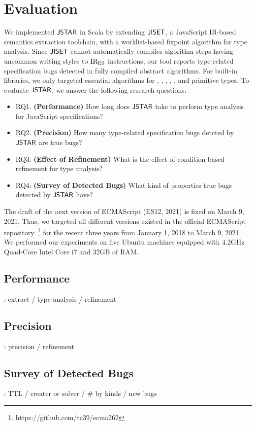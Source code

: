 \section{Evaluation}\label{sec:eval}

We implemented $\textsf{JSTAR}$ in Scala by extending $\textsf{JISET}$, a JavaScript IR-based
semantics extraction toolchain, with a worklist-based fixpoint algorithm for
type analysis.  Since $\textsf{JISET}$ cannot automatically compiles algorithm steps
having uncommon writing styles to ${\text{IR}_\text{ES}}$ instructions, our tool reports
type-related specification bugs detected in fully compiled abstract algorithms.
For built-in libraries, we only targeted essential algorithms for
, , , ,
, and primitive types.  To evaluate $\textsf{JSTAR}$, we answer the
following research questions:
\begin{itemize}
  \item RQ1. \textbf{(Performance)} How long does $\textsf{JSTAR}$ take to perform type
    analysis for JavaScript specifications?
  \item RQ2. \textbf{(Precision)} How many type-related specification bugs
    detcted by $\textsf{JSTAR}$ are true bugs?
  \item RQ3. \textbf{(Effect of Refinement)} What is the effect of
    condition-based refinement for type analysis?
  \item RQ4: \textbf{(Survey of Detected Bugs)} What kind of properties true
    bugs detected by $\textsf{JSTAR}$ have?
\end{itemize}
The draft of the next version of ECMAScript (ES12, 2021) is fixed on March 9,
2021.  Thus, we targeted all different  versions existed in the
official ECMAScript repository~\footnote{https://github.com/tc39/ecma262} for
the recent three years from January 1, 2018 to March 9, 2021.  We performed our
experiments on five Ubuntu machines equipped with 4.2GHz Quad-Core Intel Core i7
and 32GB of RAM.


\subsection{Performance}

\todo: extract / type analysis / refinement


\subsection{Precision}

\todo: precision / refinement


\subsection{Survey of Detected Bugs}

\todo: TTL / creater or solver / \# by kinds / new bugs
